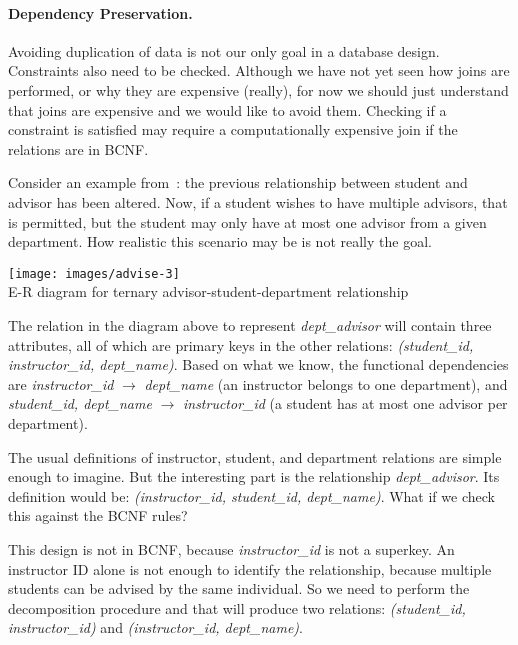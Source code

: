 \documentclass[a4paper]{report}
\begin{document}
\paragraph{Dependency Preservation.} Avoiding duplication of data is not our only goal in a database design. Constraints also need to be checked. Although we have not yet seen how joins are performed, or why they are expensive (really), for now we should just understand that joins are expensive and we would like to avoid them. Checking if a constraint is satisfied may require a computationally expensive join if the relations are in BCNF.

Consider an example from~\cite{dsc}: the previous relationship between student and advisor has been altered. Now, if a student wishes to have multiple advisors, that is permitted, but the student may only have at most one advisor from a given department. How realistic this scenario may be is not really the goal.

\begin{center}
\texttt{[image: images/advise-3]}\\
E-R diagram for ternary advisor-student-department relationship~\cite{dsc}
\end{center}

The relation in the diagram above to represent \textit{dept\_advisor} will contain three attributes, all of which are primary keys in the other relations: \textit{(student\_id, instructor\_id, dept\_name)}. Based on what we know, the functional dependencies are \textit{instructor\_id} $\rightarrow$ \textit{dept\_name} (an instructor belongs to one department), and \textit{student\_id, dept\_name} $\rightarrow$ \textit{instructor\_id} (a student has at most one advisor per department). 

The usual definitions of instructor, student, and department relations are simple enough to imagine. But the interesting part is the relationship \textit{dept\_advisor}. Its definition would be: \textit{(instructor\_id, student\_id, dept\_name)}. What if we check this against the BCNF rules?

This design is not in BCNF, because \textit{instructor\_id} is not a superkey. An instructor ID alone is not enough to identify the relationship, because multiple students can be advised by the same individual. So we need to perform the decomposition procedure and that will produce two relations: \textit{(student\_id, instructor\_id)} and \textit{(instructor\_id, dept\_name)}.
\end{document}
